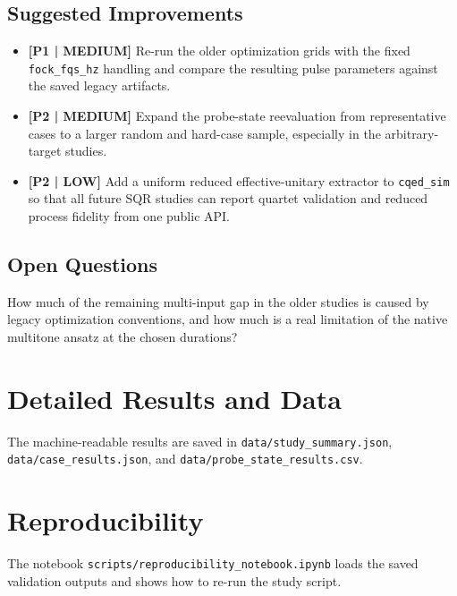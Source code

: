 \documentclass[aps,pra,twocolumn,reprint,amsmath,amssymb]{revtex4-2}
\begin{document}
\subsection{Suggested Improvements}
\begin{itemize}
  \item \textbf{[P1 | MEDIUM]} Re-run the older optimization grids with the fixed \texttt{fock\_fqs\_hz} handling and compare the resulting pulse parameters against the saved legacy artifacts.
  \item \textbf{[P2 | MEDIUM]} Expand the probe-state reevaluation from representative cases to a larger random and hard-case sample, especially in the arbitrary-target studies.
  \item \textbf{[P2 | LOW]} Add a uniform reduced effective-unitary extractor to \texttt{cqed\_sim} so that all future SQR studies can report quartet validation and reduced process fidelity from one public API.
\end{itemize}

\subsection{Open Questions}
How much of the remaining multi-input gap in the older studies is caused by legacy optimization conventions, and how much is a real limitation of the native multitone ansatz at the chosen durations?




\appendix

\section{Detailed Results and Data}
The machine-readable results are saved in \texttt{data/study\_summary.json}, \texttt{data/case\_results.json}, and \texttt{data/probe\_state\_results.csv}.

\section{Reproducibility}
The notebook \texttt{scripts/reproducibility\_notebook.ipynb} loads the saved validation outputs and shows how to re-run the study script.
\end{document}
